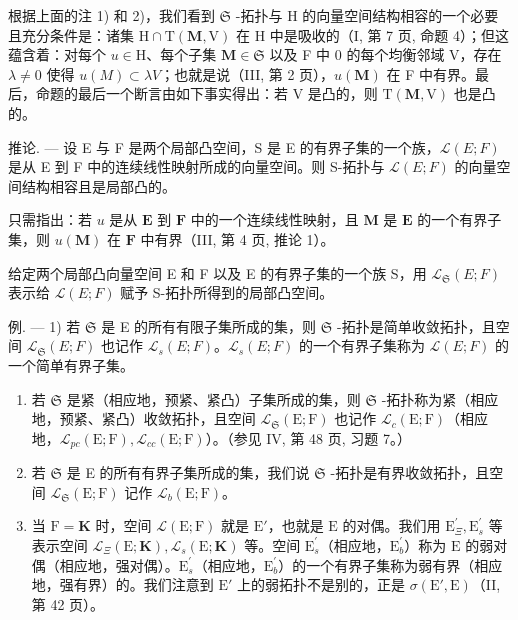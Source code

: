 根据上面的注 1) 和 2)，我们看到 \(\mathfrak{S}\) -拓扑与 H 的向量空间结构相容的一个必要且充分条件是：诸集 \(\mathrm{H} \cap \mathrm{T}(\mathbf{M}, \mathrm{V})\) 在 H 中是吸收的（I, 第 7 页, 命题 4）；但这蕴含着：对每个 \(u \in \mathrm{H}\)、每个子集 \(\mathbf{M} \in \mathfrak{S}\) 以及 F 中 0 的每个均衡邻域 V，存在 \(\lambda \neq 0\) 使得 \(u(M) \subset \lambda V\)；也就是说（III, 第 2 页），\(u(\mathbf{M})\) 在 F 中有界。最后，命题的最后一个断言由如下事实得出：若 V 是凸的，则 \(\mathrm{T}(\mathbf{M}, \mathrm{V})\) 也是凸的。

推论. --- 设 E 与 F 是两个局部凸空间，S 是 E 的有界子集的一个族，\(\mathcal{L}(E; F)\) 是从 E 到 F 中的连续线性映射所成的向量空间。则 S-拓扑与 \(\mathcal{L}(E; F)\) 的向量空间结构相容且是局部凸的。

只需指出：若 \(u\) 是从 \(\mathbf{E}\) 到 \(\mathbf{F}\) 中的一个连续线性映射，且 \(\mathbf{M}\) 是 \(\mathbf{E}\) 的一个有界子集，则 \(u(\mathbf{M})\) 在 \(\mathbf{F}\) 中有界（III, 第 4 页, 推论 1）。

给定两个局部凸向量空间 E 和 F 以及 E 的有界子集的一个族 S，用 \(\mathcal{L}_{\mathfrak{S}}(E;F)\) 表示给 \(\mathcal{L}(E;F)\) 赋予 S-拓扑所得到的局部凸空间。

例. --- 1) 若 \(\mathfrak{S}\) 是 E 的所有有限子集所成的集，则 \(\mathfrak{S}\) -拓扑是简单收敛拓扑，且空间 \(\mathcal{L}_{\mathfrak{S}}(E; F)\) 也记作 \(\mathcal{L}_s(E; F)\)。\(\mathcal{L}_s(E; F)\) 的一个有界子集称为 \(\mathcal{L}(E; F)\) 的一个简单有界子集。

\begin{enumerate}
\def\labelenumi{\arabic{enumi})}
\setcounter{enumi}{1}
\item
  若 \(\mathfrak{S}\) 是紧（相应地，预紧、紧凸）子集所成的集，则 \(\mathfrak{S}\) -拓扑称为紧（相应地，预紧、紧凸）收敛拓扑，且空间 \(\mathcal{L}_{\mathfrak{S}}(\mathrm{E};\mathrm{F})\) 也记作 \(\mathcal{L}_c(\mathrm{E};\mathrm{F})\)（相应地，\(\mathcal{L}_{pc}(\mathrm{E};\mathrm{F}),\mathcal{L}_{cc}(\mathrm{E};\mathrm{F})\)）。（参见 IV, 第 48 页, 习题 7。）
\item
  若 \(\mathfrak{S}\) 是 E 的所有有界子集所成的集，我们说 \(\mathfrak{S}\) -拓扑是有界收敛拓扑，且空间 \(\mathcal{L}_{\mathfrak{S}}(\mathrm{E};\mathrm{F})\) 记作 \(\mathcal{L}_b(\mathrm{E};\mathrm{F})\)。
\item
  当 \(\mathrm{F} = \mathbf{K}\) 时，空间 \(\mathcal{L}(\mathrm{E};\mathrm{F})\) 就是 \(\mathrm{E}'\)，也就是 \(\mathrm{E}\) 的对偶。我们用 \(\mathrm{E}_{\Xi}^{\prime}, \mathrm{E}_{s}^{\prime}\) 等表示空间 \(\mathcal{L}_{\Xi}(\mathrm{E};\mathbf{K}), \mathcal{L}_s(\mathrm{E};\mathbf{K})\) 等。空间 \(\mathrm{E}_s^\prime\)（相应地，\(\mathrm{E}_b^\prime\)）称为 \(\mathrm{E}\) 的弱对偶（相应地，强对偶）。\(\mathrm{E}_s^\prime\)（相应地，\(\mathrm{E}_b^\prime\)）的一个有界子集称为弱有界（相应地，强有界）的。我们注意到 \(\mathrm{E}'\) 上的弱拓扑不是别的，正是 \(\sigma (\mathrm{E}',\mathrm{E})\)（II, 第 42 页）。
\end{enumerate}

